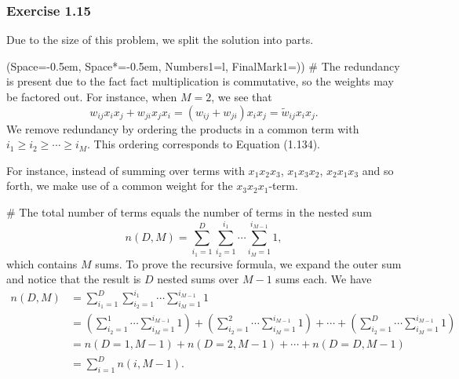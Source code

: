 \documentclass[12pt, a4paper]{article}
\newcommand{\listSpace}{-0.5em}%
\begin{document}
\subsubsection*{Exercise 1.15}
Due to the size of this problem, we split the solution into parts.
\begin{easylist}[enumerate]
	\ListProperties(Space=\listSpace, Space*=\listSpace, Numbers1=l, FinalMark1={)})
	# The redundancy is present due to the fact fact multiplication is commutative, so the weights may be factored out.
	For instance, when $M=2$, we see that 
	\begin{equation*}
		w_{ij}x_i x_j + w_{ji} x_j x_i = (w_{ij} + w_{ji}) x_i x_j = \widetilde{w}_{ij} x_i x_j.
	\end{equation*}
	We remove redundancy by ordering the products in a common term with $i_1 \geq i_2 \geq \cdots \geq i_M$.
	This ordering corresponds to Equation (1.134).
	
	For instance, instead of summing over terms with $x_1 x_2 x_3$, $x_1 x_3 x_2$, $x_2 x_1 x_3$ and so forth, we make use of a common weight for the $x_3 x_2 x_1$-term.
	
	# The total number of terms equals the number of terms in the nested sum
	\begin{equation*}
		n(D, M) = \sum_{i_1 = 1}^{D} 
		\sum_{i_2 = 1}^{i_1}
		\cdots
		\sum_{i_M = 1}^{i_{M - 1}} 1,
	\end{equation*}
	which contains $M$ sums.
	To prove the recursive formula, we expand the outer sum and notice that the result is $D$ nested sums over $M-1$ sums each.
	We have
	\begin{align*}
		n(D, M) &= \sum_{i_1 = 1}^{D} 
		\sum_{i_2 = 1}^{i_1}
		\cdots
		\sum_{i_M = 1}^{i_{M - 1}} 1 \\
		&= 
		\left( 
		\sum_{i_2 = 1}^{1}
		\cdots
		\sum_{i_M = 1}^{i_{M - 1}} 1
		\right)+\left( 
		\sum_{i_2 = 1}^{2}
		\cdots
		\sum_{i_M = 1}^{i_{M - 1}} 1
		\right)+
		\cdots
		+\left( 
		\sum_{i_2 = 1}^{D}
		\cdots
		\sum_{i_M = 1}^{i_{M - 1}} 1 \right) \\
		&= n(D=1, M-1) + n(D=2, M-1) + \cdots + n(D=D, M-1) \\
		&= \sum_{i=1}^{D} n(i, M-1).
	\end{align*}
	

\end{easylist}
\end{document}
